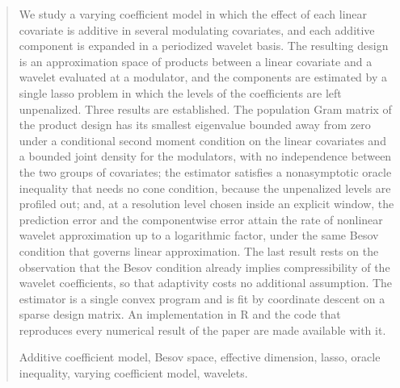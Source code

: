 \documentclass[12pt]{article} %
\renewcommand{\theequation}{\thesection\arabic{equation}}
\theoremstyle{definition}
\begin{document}
\begin{quotation}
We study a varying coefficient model in which the effect of each linear
covariate is additive in several modulating covariates, and each additive
component is expanded in a periodized wavelet basis. The resulting design is
\textcolor{colR1}{an approximation space} of products between a linear covariate and a wavelet evaluated at a
modulator, and the components are estimated by a single lasso problem in
which the levels of the coefficients are left unpenalized. Three results are
established. The population Gram matrix of the product design has its
smallest eigenvalue bounded away from zero under a conditional second moment
condition on the linear covariates and a bounded joint density for the
modulators, with no independence between the two groups of covariates; the
estimator satisfies a nonasymptotic oracle inequality that needs no cone
condition, because the unpenalized levels are profiled out; and, at a
resolution level chosen inside an explicit window, the prediction error and
the componentwise error attain the rate of nonlinear wavelet approximation up
to a logarithmic factor, under the same Besov condition that governs
\textcolor{colR1}{linear approximation}. The last result rests on the observation that the Besov
condition already implies compressibility of the \textcolor{colR1}{wavelet} coefficients, so that
adaptivity costs no additional assumption. The estimator is a single convex
program and is fit by coordinate descent on a sparse design matrix.
\textcolor{colR1}{An implementation in R and the code that reproduces every
numerical result of the paper are made available with it.}

\vspace{9pt}
Additive coefficient model, Besov space, effective dimension, lasso, oracle
inequality, varying coefficient model, wavelets.
\par
\end{quotation}\par

\def\thefigure{\arabic{figure}}
\def\thetable{\arabic{table}}

\renewcommand{\theequation}{\thesection.\arabic{equation}}

\fontsize{12}{14pt plus.8pt minus .6pt}\selectfont
\end{document}
